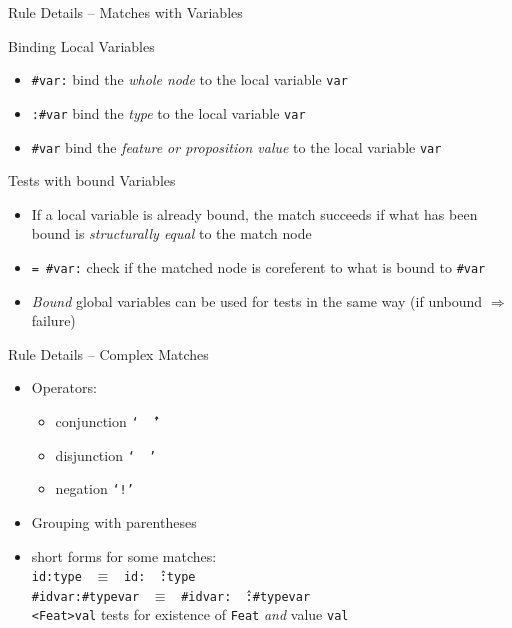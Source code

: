 \documentclass{beamer}
\begin{document}

\begin{frame}{Rule Details -- Matches with Variables}
  \begin{block}{Binding Local Variables}
    \begin{itemize}
    \item \texttt{\#var:} bind the \emph{whole node} to the local variable
      \texttt{var}
    \item \texttt{:\#var} bind the \emph{type} to the local variable
      \texttt{var}
    \item \texttt{\#var} bind the \emph{feature or proposition value} to the
      local variable \texttt{var}
    \end{itemize}
  \end{block}
  \begin{block}{Tests with bound Variables}
    \begin{itemize}
    \item If a local variable is already bound, the match succeeds if what has
      been bound is \emph{structurally equal} to the match node
    \item \texttt{= \#var:} check if the matched node is coreferent to what is
      bound to \texttt{\#var}
    \item \emph{Bound} global variables can be used for tests in the same way
      (if unbound $\Rightarrow$ failure)
    \end{itemize}
  \end{block}
\end{frame}


\begin{frame}{Rule Details -- Complex Matches}
  \begin{itemize}
  \item Operators:
    \begin{itemize}
    \item conjunction \texttt{`\,\^\,'}
    \item disjunction \texttt{`\,\textbar\,'}
    \item negation \texttt{`!'}
    \end{itemize}
  \item Grouping with parentheses
  \item short forms for some matches:\\
    \texttt{id:type} \ $\equiv$ \ \texttt{id:\,\^\,:type}\\
    \texttt{\#idvar:\#typevar} \ $\equiv$ \ \texttt{\#idvar:\,\^\,:\#typevar}\\
    \texttt{<Feat>val} tests for existence of \texttt{Feat} \emph{and} value
    \texttt{val}
  \end{itemize}
\end{frame}
\end{document}
